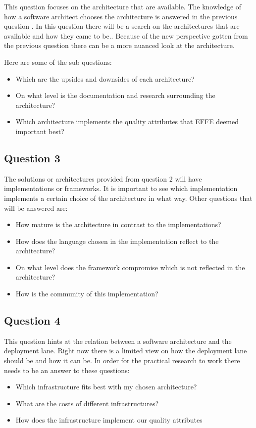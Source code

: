 This question focuses on the architecture that are available. The knowledge of how a software architect chooses the architecture is answered in the previous question . In this question there will be a search on the architectures that are available and how they came to be.. Because of the new perspective gotten from the previous question there can be a more nuanced look at the architecture.

Here are some of the sub questions:
\begin{itemize}
	\item Which are the upsides and downsides of each architecture?
	\item On what level is the documentation and research surrounding the architecture?
	\item Which architecture implements the quality attributes that EFFE deemed important best?
\end{itemize}

\subsection{Question 3}

The solutions or architectures provided from question 2 will have implementations or frameworks. It is important to see which implementation implements a certain choice of the architecture in what way. Other questions that will be answered are:
\begin{itemize}
	\item How mature is the architecture in contrast to the implementations?
	\item How does the language chosen in the implementation reflect to the architecture?
	\item On what level does the framework compromise which is not reflected in the architecture?
	\item How is the community of this implementation?
\end{itemize}

\subsection{Question 4}


This question hints at the relation between a software architecture and the deployment lane. Right now there is a limited view on how the deployment lane should be and how it can be. In order for the practical research to work there needs to be an answer to these questions:
\begin{itemize}
	\item Which infrastructure fits best with my chosen architecture?
	\item What are the costs of different infrastructures?
	\item How does the infrastructure implement our quality attributes
\end{itemize}
